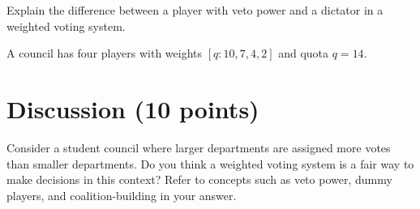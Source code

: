 \documentclass[12pt]{exam}
\begin{document}
\begin{questions}
\newpage
\question[4] Explain the difference between a player with veto power and a dictator in a weighted voting system.

\vspace{7cm}

\question[6] A council has four players with weights $[q : 10, 7, 4, 2]$ and quota $q = 14$.

\newpage
\section*{Discussion (10 points)}

\question[10] Consider a student council where larger departments are assigned more votes than smaller departments. Do you think a weighted voting system is a fair way to make decisions in this context? Refer to concepts such as veto power, dummy players, and coalition-building in your answer.

\vspace{8cm}

\end{questions}
\end{document}
